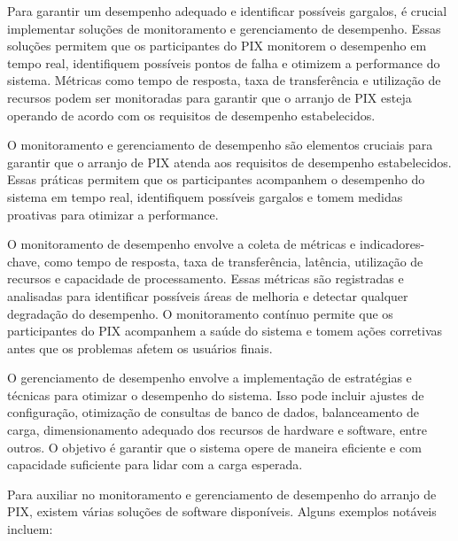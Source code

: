 \documentclass[12pt]{article}
\begin{document}
Para garantir um desempenho adequado e identificar possíveis gargalos, é crucial implementar soluções de monitoramento e gerenciamento de desempenho. Essas soluções permitem que os participantes do PIX monitorem o desempenho em tempo real, identifiquem possíveis pontos de falha e otimizem a performance do sistema. Métricas como tempo de resposta, taxa de transferência e utilização de recursos podem ser monitoradas para garantir que o arranjo de PIX esteja operando de acordo com os requisitos de desempenho estabelecidos.

O monitoramento e gerenciamento de desempenho são elementos cruciais para garantir que o arranjo de PIX atenda aos requisitos de desempenho estabelecidos. Essas práticas permitem que os participantes acompanhem o desempenho do sistema em tempo real, identifiquem possíveis gargalos e tomem medidas proativas para otimizar a performance.

O monitoramento de desempenho envolve a coleta de métricas e indicadores-chave, como tempo de resposta, taxa de transferência, latência, utilização de recursos e capacidade de processamento. Essas métricas são registradas e analisadas para identificar possíveis áreas de melhoria e detectar qualquer degradação do desempenho. O monitoramento contínuo permite que os participantes do PIX acompanhem a saúde do sistema e tomem ações corretivas antes que os problemas afetem os usuários finais.

O gerenciamento de desempenho envolve a implementação de estratégias e técnicas para otimizar o desempenho do sistema. Isso pode incluir ajustes de configuração, otimização de consultas de banco de dados, balanceamento de carga, dimensionamento adequado dos recursos de hardware e software, entre outros. O objetivo é garantir que o sistema opere de maneira eficiente e com capacidade suficiente para lidar com a carga esperada.

Para auxiliar no monitoramento e gerenciamento de desempenho do arranjo de PIX, existem várias soluções de software disponíveis. Alguns exemplos notáveis incluem:
\end{document}

